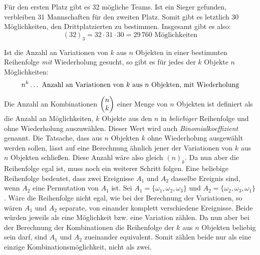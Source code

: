 
F\"{u}r den ersten Platz gibt es 32 m\"{o}gliche Teams. Ist ein Sieger gefunden, verbleiben 31 Mannschaften f\"{u}r den zweiten Platz. Somit gibt es letztlich 30 M\"{o}glichkeiten, den Drittplatzierten zu bestimmen. Insgesamt gibt es also: $$(32)_3 = 32 \cdot 31 \cdot 30 = 29 \, 760 \text{ M\"{o}glichkeiten}$$

Ist die Anzahl an Variationen von $k$ aus $n$ Objekten in einer bestimmten Reihenfolge \emph{mit} Wiederholung gesucht, so gibt es f\"{u}r jedes der $k$ Objekte $n$ M\"{o}glichkeiten: $$n^k \dots \,\, \text{Anzahl an Variationen von $k$ aus $n$ Objekten, mit Wiederholung}$$


Die Anzahl an Kombinationen $\begin{pmatrix}n \\ k\end{pmatrix}$ einer Menge von $n$ Objekten ist definiert als die Anzahl an M\"{o}glichkeiten, $k$ Objekte aus den $n$ in \emph{beliebiger} Reihenfolge und ohne Wiederholung auszuw\"{a}hlen. Dieser Wert wird auch \emph{Binomialkoeffizient} genannt. Die Tatsache, dass aus $n$ Objekten $k$ ohne Wiederholung ausgew\"{a}hlt werden sollen, l\"{a}sst auf eine Berechnung \"{a}hnlich jener der Variationen von $k$ aus $n$ Objekten schlie\ss{}en. Diese Anzahl w\"{a}re also gleich $(n)_k$. Da nun aber die Reihenfolge egal ist, muss noch ein weiterer Schritt folgen. Eine beliebige Reihenfolge bedeutet, dass zwei Ereignisse $A_1$ und $A_2$ dasselbe Ereignis sind, wenn $A_2$ eine Permutation von $A_1$ ist. Sei $A_1 = \{\omega_1, \omega_2, \omega_3\}$ und $A_2 = \{ \omega_2, \omega_3, \omega_1\}$. W\"{a}re die Reihenfolge nicht egal, wie bei der Berechnung der Variationen, so w\"{a}ren $A_1$ und $A_2$ separate, von einander komplett verschiedene Ereignisse. Beide w\"{u}rden jeweils als eine M\"{o}glichkeit bzw. eine Variation z\"{a}hlen. Da nun aber bei der Berechnung der Kombinationen die Reihenfolge der $k$ aus $n$ Objekten beliebig sein darf, sind $A_1$ und $A_2$ zueinander equivalent. Somit z\"{a}hlen beide nur als eine einzige Kombinationsm\"{o}glichkeit, nicht als zwei.

